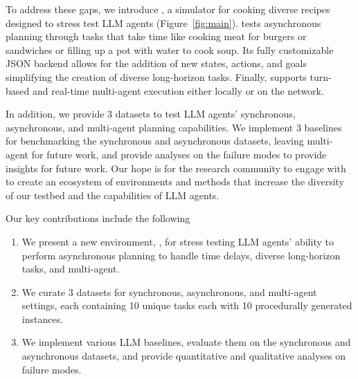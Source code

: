 To address these gaps, we introduce \robotouille, a simulator for cooking diverse recipes designed to stress test LLM agents (Figure~\ref{fig:main}). \robotouille tests asynchronous planning through tasks that take time like cooking meat for burgers or sandwiches or filling up a pot with water to cook soup. Its fully customizable JSON backend allows for the addition of new states, actions, and goals simplifying the creation of diverse long-horizon tasks. Finally, \robotouille supports turn-based and real-time multi-agent execution either locally or on the network.

In addition, we provide 3 datasets to test LLM agents' synchronous, asynchronous, and multi-agent planning capabilities. We implement 3 baselines for benchmarking the synchronous and asynchronous datasets, leaving multi-agent for future work, and provide analyses on the failure modes to provide insights for future work. Our hope is for the research community to engage with \robotouille to create an ecosystem of environments and methods that increase the diversity of our testbed and the capabilities of LLM agents.



Our key contributions include the following
\begin{enumerate}
    \item We present a new environment, \robotouille, for stress testing LLM agents' ability to perform asynchronous planning to handle time delays, diverse long-horizon tasks, and multi-agent.
    \item We curate 3 datasets for synchronous, asynchronous, and multi-agent settings, each containing 10 unique tasks each with 10 procedurally generated instances.
    \item We implement various LLM baselines, evaluate them on the synchronous and asynchronous datasets, and provide quantitative and qualitative analyses on failure modes.
\end{enumerate}











